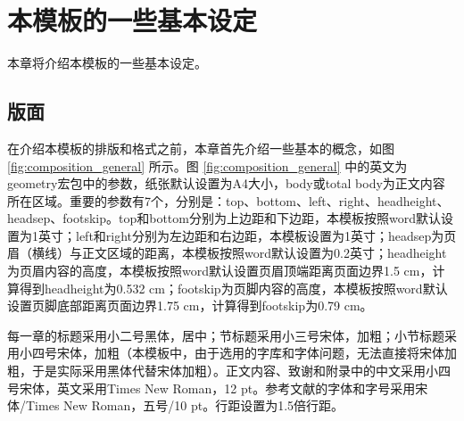 \chapter{本模板的一些基本设定}
\label{cha:format}
本章将介绍本模板的一些基本设定。
\section{版面}
\label{sec:composition}
在介绍本模板的排版和格式之前，本章首先介绍一些基本的概念，如图 \ref{fig:composition_general} 所示。图 \ref{fig:composition_general} 中的英文为geometry宏包中的参数，纸张默认设置为A4大小，body或total body为正文内容所在区域。重要的参数有7个，分别是：top、bottom、left、right、headheight、headsep、footskip。top和bottom分别为上边距和下边距，本模板按照word默认设置为1英寸；left和right分别为左边距和右边距，本模板设置为1英寸；headsep为页眉（横线）与正文区域的距离，本模板按照word默认设置为0.2英寸；headheight为页眉内容的高度，本模板按照word默认设置页眉顶端距离页面边界1.5 cm，计算得到headheight为0.532 cm；footskip为页脚内容的高度，本模板按照word默认设置页脚底部距离页面边界1.75 cm，计算得到footskip为0.79 cm。


每一章的标题采用小二号黑体，居中；节标题采用小三号宋体，加粗；小节标题采用小四号宋体，加粗（本模板中，由于选用的字库和字体问题，无法直接将宋体加粗，于是实际采用黑体代替宋体加粗）。正文内容、致谢和附录中的中文采用小四号宋体，英文采用Times New Roman，12 pt。参考文献的字体和字号采用宋体/Times New Roman，五号/10 pt。行距设置为1.5倍行距。


